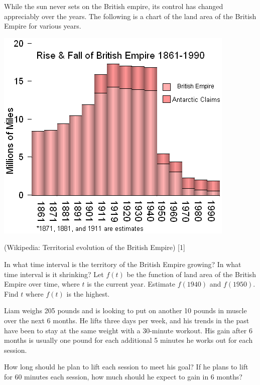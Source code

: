 \begin{exercise}
While the sun never sets on the British empire, its control has changed appreciably over the years.  The following is a chart of the land area of the British Empire for various years.  

\begin{center}
\includegraphics{images/riseandfall.png}
\end{center}

(Wikipedia: Territorial evolution of the British Empire) [1]

In what time interval is the territory of the British Empire growing?  In what time interval is it shrinking?  Let $f(t)$ be the function of land area of the British Empire over time, where $t$ is the current year.  Estimate $f(1940)$ and $f(1950)$.  Find $t$ where $f(t)$ is the highest.

\end{exercise}
\bigskip

\begin{exercise}
Liam weighs 205 pounds and is looking to put on another 10 pounds in muscle over the next 6 months.  He lifts three days per week, and his trends in the past have been to stay at the same weight with a 30-minute workout.  His gain after 6 months is usually one pound for each additional 5 minutes he works out for each session.

How long should he plan to lift each session to meet his goal?
If he plans to lift for 60 minutes each session, how much should he expect to gain in 6 months?
\end{exercise}
\bigskip

